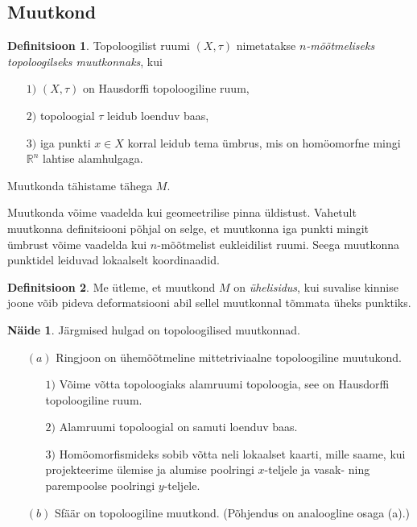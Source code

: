 \documentclass[12pt,a4paper,oneside]{article}
\theoremstyle{plain}
\theoremstyle{definition}
\newtheorem{definitsioon}{Definitsioon}[section]
\newtheorem{naide}{Näide}[section]
\numberwithin{equation}{section}
\def\R{{\mathbb R}}
\begin{document}
\newpage
\subsection{Muutkond}

\begin{definitsioon}
Topoloogilist ruumi $\left(X, \tau\right)$ nimetatakse 
\emph{$n$-mõõtmeliseks topoloogilseks muutkonnaks}, kui
\begin{itemize}
\item[$1)$] $\left(X, \tau\right)$ on Hausdorffi topoloogiline ruum,
\item[$2)$] topoloogial $\tau$ leidub loenduv baas,
\item[$3)$] iga punkti $x \in X$ korral leidub tema ümbrus, mis on 
	homöomorfne mingi $\R^n$ lahtise alamhulgaga.
\end{itemize}
Muutkonda tähistame tähega $M$.
\end{definitsioon}

Muutkonda võime vaadelda kui geomeetrilise pinna üldistust. 
Vahetult muutkonna definitsiooni põhjal on selge, et muutkonna 
iga punkti mingit ümbrust võime vaadelda kui $n$-mõõtmelist 
eukleidilist ruumi. Seega muutkonna punktidel leiduvad lokaalselt 
koordinaadid.

\begin{definitsioon}
Me ütleme, et muutkond $M$ on \emph{ühelisidus}, kui suvalise 
kinnise joone võib pideva deformatsiooni abil sellel muutkonnal 
tõmmata üheks punktiks.
\end{definitsioon}

\begin{naide}
Järgmised hulgad on topoloogilised muutkonnad.
\begin{itemize}
\item[$(a)$] Ringjoon on ühemõõtmeline mittetriviaalne topoloogiline 
muutukond.
\begin{itemize}
\item[$1)$] Võime võtta topoloogiaks alamruumi topoloogia, see on 
Hausdorffi topoloogiline ruum.
\item[$2)$] Alamruumi topoloogial on samuti loenduv baas.
\item[$3)$] Homöomorfismideks sobib võtta neli lokaalset kaarti, 
mille saame, kui projekteerime ülemise ja alumise poolringi 
$x$-teljele ja vasak- ning parempoolse poolringi $y$-teljele.
\end{itemize}
\item[$(b)$] Sfäär on topoloogiline muutkond. (Põhjendus on 
analoogline osaga (a).)
\end{itemize}
\end{naide}
\end{document}
